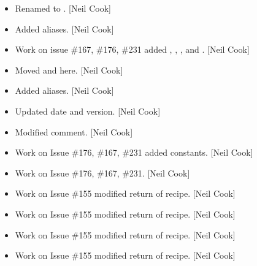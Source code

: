 \documentclass[a4paper,10pt,english]{report}
\begin{document}
\begin{itemize}
\item {} 
Renamed  to . {[}Neil Cook{]}

\item {} 
Added aliases. {[}Neil Cook{]}

\item {} 
Work on issue \#167, \#176, \#231 \sphinxhyphen{} added ,
, , and
. {[}Neil Cook{]}

\item {} 
Moved  and  here.
{[}Neil Cook{]}

\item {} 
Added aliases. {[}Neil Cook{]}

\item {} 
Updated date and version. {[}Neil Cook{]}

\item {} 
Modified comment. {[}Neil Cook{]}

\item {} 
Work on Issue \#176, \#167, \#231 \sphinxhyphen{} added constants. {[}Neil Cook{]}

\item {} 
Work on Issue \#176, \#167, \#231. {[}Neil Cook{]}

\item {} 
Work on Issue \#155 \sphinxhyphen{} modified return of recipe. {[}Neil Cook{]}

\item {} 
Work on Issue \#155 \sphinxhyphen{} modified return of recipe. {[}Neil Cook{]}

\item {} 
Work on Issue \#155 \sphinxhyphen{} modified return of recipe. {[}Neil Cook{]}

\item {} 
Work on Issue \#155 \sphinxhyphen{} modified return of recipe. {[}Neil Cook{]}

\end{itemize}
\end{document}
